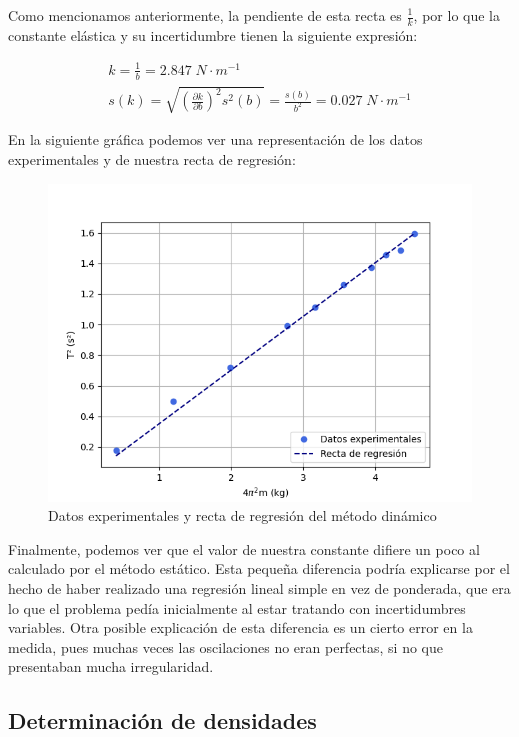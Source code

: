 \documentclass[a4paper,12pt,titlepage]{report}
\begin{document}
Como mencionamos anteriormente, la pendiente de esta recta es $\frac{1}{k}$, por lo que la constante elástica y su incertidumbre tienen la siguiente expresión:

\begin{equation}
    \begin{gathered}
        k = \frac{1}{b} = 2.847 \; N\cdot m^{-1} \\
        s(k) = \sqrt{\left (\frac{\partial k}{\partial b} \right )^2s^2(b)} = \frac{s(b)}{b^2} = 0.027 \; N\cdot m^{-1}
    \end{gathered}
\end{equation}

En la siguiente gráfica podemos ver una representación de los datos experimentales y de nuestra recta de regresión:

\begin{figure}[h!]
    \centering
    \includegraphics[width=0.75\linewidth]{Images/RegDinamico.png}
    \caption{Datos experimentales y recta de regresión del método dinámico}
\end{figure}

\newpage

Finalmente, podemos ver que el valor de nuestra constante difiere un poco al calculado por el método estático. Esta pequeña diferencia podría explicarse por el hecho de haber realizado una regresión lineal simple en vez de ponderada, que era lo que el problema pedía inicialmente al estar tratando con incertidumbres variables. Otra posible explicación de esta diferencia es un cierto error en la medida, pues muchas veces las oscilaciones no eran perfectas, si no que presentaban mucha irregularidad.



\subsection{Determinación de densidades}
\end{document}
